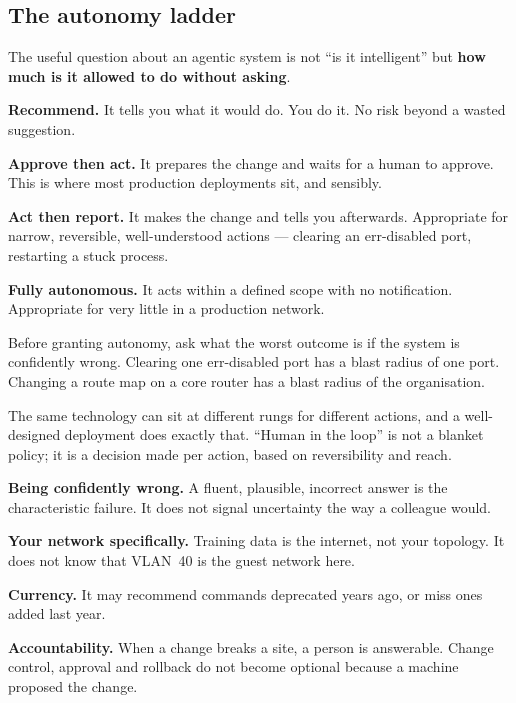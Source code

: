 \subsection{The autonomy ladder}

The useful question about an agentic system is not ``is it intelligent'' but
\textbf{how much is it allowed to do without asking}.

\begin{tight}
  \item \textbf{Recommend.} It tells you what it would do. You do it. No risk
        beyond a wasted suggestion.
  \item \textbf{Approve then act.} It prepares the change and waits for a human
        to approve. This is where most production deployments sit, and sensibly.
  \item \textbf{Act then report.} It makes the change and tells you afterwards.
        Appropriate for narrow, reversible, well-understood actions --- clearing
        an err-disabled port, restarting a stuck process.
  \item \textbf{Fully autonomous.} It acts within a defined scope with no
        notification. Appropriate for very little in a production network.
\end{tight}

\begin{conceptbox}
Before granting autonomy, ask what the worst outcome is if the system is
confidently wrong. Clearing one err-disabled port has a blast radius of one port.
Changing a route map on a core router has a blast radius of the organisation.

The same technology can sit at different rungs for different actions, and a
well-designed deployment does exactly that. ``Human in the loop'' is not a
blanket policy; it is a decision made per action, based on reversibility and
reach.
\end{conceptbox}

\begin{alertbox}
\begin{tight}
  \item \textbf{Being confidently wrong.} A fluent, plausible, incorrect answer
        is the characteristic failure. It does not signal uncertainty the way a
        colleague would.
  \item \textbf{Your network specifically.} Training data is the internet, not
        your topology. It does not know that VLAN~40 is the guest network here.
  \item \textbf{Currency.} It may recommend commands deprecated years ago, or
        miss ones added last year.
  \item \textbf{Accountability.} When a change breaks a site, a person is
        answerable. Change control, approval and rollback do not become optional
        because a machine proposed the change.
\end{tight}
\end{alertbox}

